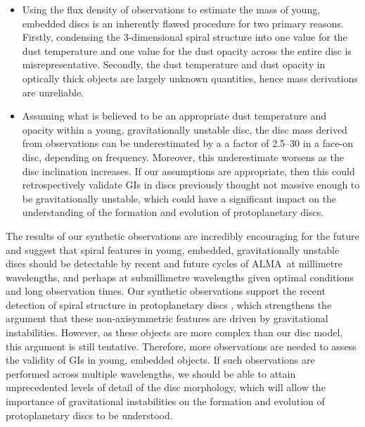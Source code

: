 \documentclass[fleqn,usenatbib]{mnras}
\newcommand{\alma}{ALMA}
\begin{document}
\begin{itemize}[leftmargin=0.0cm, itemindent=1.0cm]
\item Using the flux density of observations to estimate the mass of young, embedded discs is an inherently flawed procedure for two primary reasons. Firstly, condensing the 3-dimensional spiral structure into one value for the dust temperature and one value for the dust opacity across the entire disc is misrepresentative. Secondly, the dust temperature and dust opacity in optically thick objects are largely unknown quantities, hence mass derivations are unreliable.

\item Assuming what is believed to be an appropriate dust temperature and opacity within a young, gravitationally unstable disc, the disc mass derived from observations can be underestimated by a a factor of 2.5--30 in a face-on disc, depending on frequency. Moreover, this underestimate worsens as the disc inclination increases. If our assumptions are appropriate, then this could retrospectively validate GIs in discs previously thought not massive enough to be gravitationally unstable, which could have a significant impact on the understanding of the formation and evolution of protoplanetary discs.

\end{itemize}

The results of our synthetic observations are incredibly encouraging for the future and suggest that spiral features in young, embedded, gravitationally unstable discs should be detectable by recent and future cycles of \alma\ at millimetre wavelengths, and perhaps at submillimetre wavelengths given optimal conditions and long observation times. Our synthetic observations support the recent detection of spiral structure in protoplanetary discs \citep[e.g.][]{Tobin&Kratter2016, Perez&Carpenter2016}, which strengthens the argument that these non-axisymmetric features are driven by gravitational instabilities. However, as these objects are more complex than our disc model, this argument is still tentative. Therefore, more observations are needed to assess the validity of GIs in young, embedded objects. If such observations are performed across multiple wavelengths, we should be able to attain unprecedented levels of detail of the disc morphology, which will allow the importance of gravitational instabilities on the formation and evolution of protoplanetary discs to be understood. 

\smallskip
\end{document}
